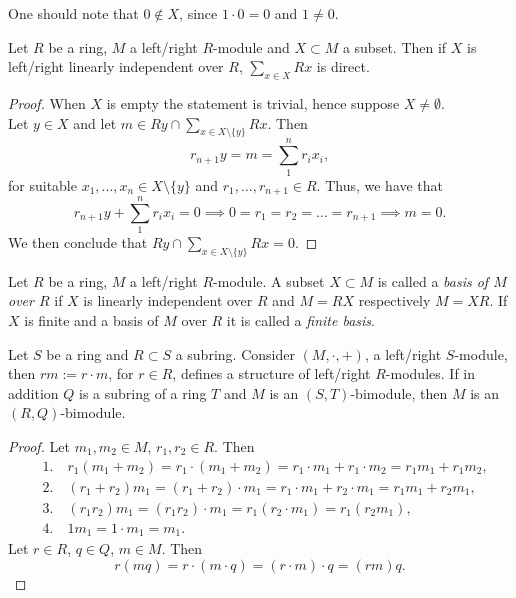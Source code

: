 \begin{remark}
    One should note that $0\notin X$, since $1\cdot 0 = 0$ and $1\neq 0$.
\end{remark}
\begin{proposition}
    Let $R$ be a ring, $M$ a left/right $R$-module and $X\subset M$ a subset. Then if $X$ is left/right linearly independent over $R$, $\sum_{x\in X} Rx$ is direct. 
\end{proposition}
\begin{proof}
    When $X$ is empty the statement is trivial, hence suppose $X\neq \emptyset$.\\ 
    Let $y\in X$ and let $m\in Ry \cap \sum_{x\in X\setminus \{y\}} Rx$. Then 
    $$r_{n+1} y = m = \sum_1^n r_i x_i,$$
    for suitable $x_1,\dots,x_n\in X\setminus\{y\}$ and $r_1,\dots,r_{n+1}\in R$. Thus, we have that 
    $$r_{n+1}y + \sum_1^n r_ix_i = 0 \implies 0=r_1=r_2=\dots=r_{n+1} \implies m = 0.$$
    We then conclude that $Ry\cap \sum_{x\in X\setminus\{y\}} Rx = 0$.
\end{proof}
\begin{definition}
    Let $R$ be a ring, $M$ a left/right $R$-module. A subset $X\subset M$ is called a \textit{basis of $M$ over $R$} if $X$ is linearly independent over $R$ and $M= RX$ respectively $M=XR$. If $X$ is finite and a basis of $M$ over $R$ it is called a \textit{finite basis}.
\end{definition}
\begin{proposition}
    Let $S$ be a ring and $R\subset S$ a subring. Consider $(M,\cdot,+)$, a left/right $S$-module, then $rm:= r\cdot m$, for $r\in R$, defines a structure of left/right $R$-modules. If in addition $Q$ is a subring of a ring $T$ and $M$ is an $(S,T)$-bimodule, then $M$ is an $(R,Q)$-bimodule.  
\end{proposition}
\begin{proof}
    Let $m_1,m_2\in M$, $r_1,r_2\in R$. Then
    \begin{align*}
        &1.\quad r_1(m_1+m_2)=r_1\cdot(m_1+m_2)=r_1\cdot m_1+r_1\cdot m_2=r_1m_1+r_1m_2,\\
        &2.\quad (r_1+r_2)m_1= (r_1+r_2)\cdot m_1=r_1\cdot m_1+r_2\cdot m_1=r_1m_1+r_2m_1,\\
        &3.\quad (r_1r_2)m_1=(r_1r_2)\cdot m_1 = r_1(r_2\cdot m_1)=r_1(r_2m_1),\\
        &4.\quad 1m_1=1\cdot m_1=m_1.
    \end{align*}
    Let $r\in R$, $q\in Q$, $m\in M$. Then
    $$r(mq)=r\cdot(m\cdot q)=(r\cdot m)\cdot q = (rm)q.$$
\end{proof}
